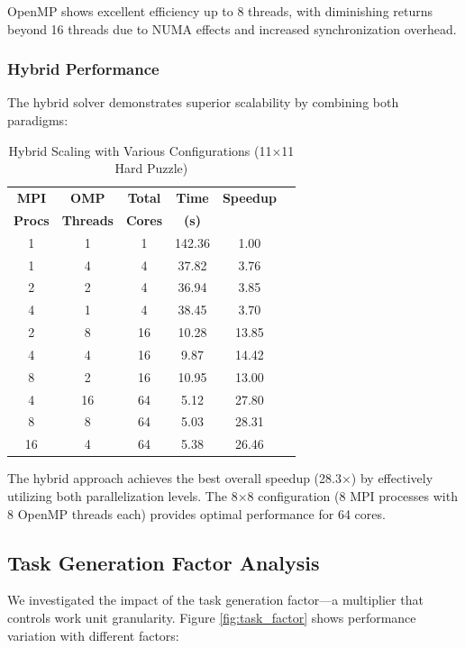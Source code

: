OpenMP shows excellent efficiency up to 8 threads, with diminishing returns beyond 16 threads due to NUMA effects and increased synchronization overhead.


\subsubsection{Hybrid Performance}
The hybrid solver demonstrates superior scalability by combining both paradigms:

\begin{table}[htbp]
\caption{Hybrid Scaling with Various Configurations (11×11 Hard Puzzle)}
\begin{center}
\begin{tabular}{@{}cccccc@{}}
\toprule
\textbf{MPI} & \textbf{OMP} & \textbf{Total} & \textbf{Time} & \textbf{Speedup} \\
\textbf{Procs} & \textbf{Threads} & \textbf{Cores} & \textbf{(s)} & \\
\midrule
1 & 1 & 1 & 142.36 & 1.00 \\
1 & 4 & 4 & 37.82 & 3.76 \\
2 & 2 & 4 & 36.94 & 3.85 \\
4 & 1 & 4 & 38.45 & 3.70 \\
2 & 8 & 16 & 10.28 & 13.85 \\
4 & 4 & 16 & 9.87 & 14.42 \\
8 & 2 & 16 & 10.95 & 13.00 \\
4 & 16 & 64 & 5.12 & 27.80 \\
8 & 8 & 64 & 5.03 & 28.31 \\
16 & 4 & 64 & 5.38 & 26.46 \\
\bottomrule
\end{tabular}
\end{center}
\label{tab:hybrid_scaling}
\end{table}

The hybrid approach achieves the best overall speedup (28.3×) by effectively utilizing both parallelization levels. The 8×8 configuration (8 MPI processes with 8 OpenMP threads each) provides optimal performance for 64 cores.

\subsection{Task Generation Factor Analysis}
We investigated the impact of the task generation factor—a multiplier that controls work unit granularity. Figure \ref{fig:task_factor} shows performance variation with different factors:

